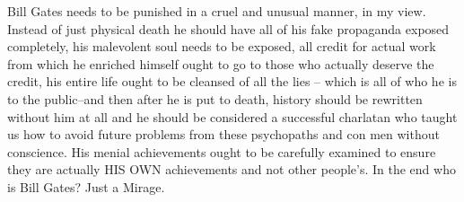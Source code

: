 \documentclass{amsart}
\begin{document}
Bill Gates needs to be punished in a cruel and unusual manner, in my view.  Instead of just physical death he should have all of his fake propaganda exposed completely, his malevolent soul needs to be exposed, all credit for actual work from which he enriched himself ought to go to those who actually deserve the credit, his entire life ought to be cleansed of all the lies -- which is all of who he is to the public--and then after he is put to death, history should be rewritten without him at all and he should be considered a successful charlatan who taught us how to avoid future problems from these psychopaths and con men without conscience.  His menial achievements ought to be carefully examined to ensure they are actually HIS OWN achievements and not other people's.  In the end who is Bill Gates?  Just a Mirage.

\begin{thebibliography}{CCC}
\end{thebibliography}
\end{document}
